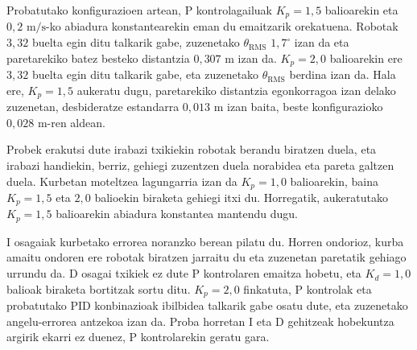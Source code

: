 Probatutako konfigurazioen artean, P kontrolagailuak $K_p = 1{,}5$ balioarekin eta $0{,}2\text{ m/s}$-ko abiadura konstantearekin eman du emaitzarik orekatuena. Robotak $3{,}32$ buelta egin ditu talkarik gabe, zuzenetako $\theta_{\text{RMS}}$ $1{,}7^\circ$ izan da eta paretarekiko batez besteko distantzia $0{,}307\text{ m}$ izan da. $K_p = 2{,}0$ balioarekin ere $3{,}32$ buelta egin ditu talkarik gabe, eta zuzenetako $\theta_{\text{RMS}}$ berdina izan da. Hala ere, $K_p = 1{,}5$ aukeratu dugu, paretarekiko distantzia egonkorragoa izan delako zuzenetan, desbideratze estandarra $0{,}013\text{ m}$ izan baita, beste konfigurazioko $0{,}028\text{ m}$-ren aldean.

Probek erakutsi dute irabazi txikiekin robotak berandu biratzen duela, eta irabazi handiekin, berriz, gehiegi zuzentzen duela norabidea eta pareta galtzen duela. Kurbetan moteltzea lagungarria izan da $K_p = 1{,}0$ balioarekin, baina $K_p = 1{,}5$ eta $2{,}0$ balioekin biraketa gehiegi itxi du. Horregatik, aukeratutako $K_p = 1{,}5$ balioarekin abiadura konstantea mantendu dugu.

I osagaiak kurbetako errorea noranzko berean pilatu du. Horren ondorioz, kurba amaitu ondoren ere robotak biratzen jarraitu du eta zuzenetan paretatik gehiago urrundu da. D osagai txikiek ez dute P kontrolaren emaitza hobetu, eta $K_d = 1{,}0$ balioak biraketa bortitzak sortu ditu. $K_p = 2{,}0$ finkatuta, P kontrolak eta probatutako PID konbinazioak ibilbidea talkarik gabe osatu dute, eta zuzenetako angelu-errorea antzekoa izan da. Proba horretan I eta D gehitzeak hobekuntza argirik ekarri ez duenez, P kontrolarekin geratu gara.

